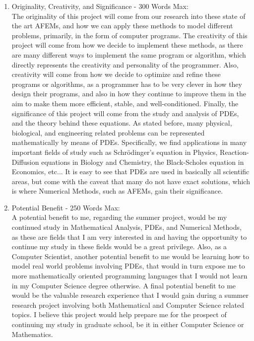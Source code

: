 \documentclass[11pt]{article}
\begin{document}
\begin{enumerate}
\item Originality, Creativity, and Significance - 300 Words Max: \\
The originality of this project will come from our research into these state of the art AFEMs, and how we can apply these methods to model different problems,
primarily, in the form of computer programs. The creativity of this project will come from how we decide to implement these methods, as there
are many different ways to implement the same program or algorithm, which directly represents the creativity and personality of the programmer.
Also, creativity will come from how we decide to optimize and refine these programs or algorithms, as a programmer has to be very clever in how they
design their programs, and also in how they continue to improve them in the aim to make them more efficient, stable, and well-conditioned.
Finally, the significance of this project will come from the study and analysis of PDEs, and the theory behind these equations. As stated before, many physical, biological, and engineering related
problems can be represented mathematically by means of PDEs. Specifically, we find applications in many important fields of study such as Schrödinger's equation in Physics,
Reaction-Diffusion equations in Biology and Chemistry, the Black-Scholes equation in Economics, etc... It is easy to see that PDEs are used in basically all scientific areas,
but come with the caveat that many do not have exact solutions, which is where Numerical Methods, such as AFEMs, gain their significance.

\newpage

\item Potential Benefit - 250 Words Max: \\
A potential benefit to me, regarding the summer project, would be my continued study in Mathematical Analysis, PDEs, and Numerical Methods,
as these are fields that I am very interested in and having the opportunity to continue my study in these fields would be a great privilege.
Also, as a Computer Scientist, another potential benefit to me would be learning how to model real world 
problems involving PDEs, that would in turn
expose me to more mathematically oriented programming languages that I would not learn in my Computer Science degree otherwise.
A final potential benefit to me would be the valuable research experience that I would gain during a summer research project involving both Mathematical
and Computer Science related topics. I believe this project would
help prepare me for the prospect of continuing my study in graduate school, be it in either Computer Science or Mathematics.


\end{enumerate}
\end{document}
